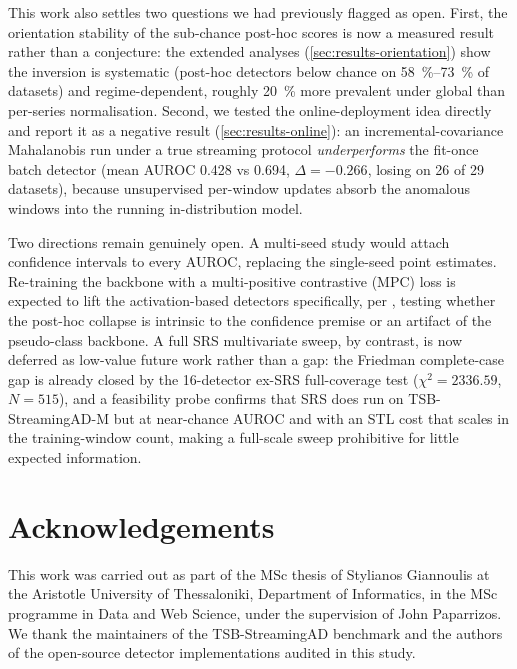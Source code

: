 \documentclass[11pt]{article}
\begin{document}
This work also settles two questions we had previously flagged as open. First, the
orientation stability of the sub-chance post-hoc scores is now a measured result
rather than a conjecture: the extended analyses (\cref{sec:results-orientation})
show the inversion is systematic (post-hoc detectors below chance on
\SIrange{58}{73}{\percent} of datasets) and regime-dependent, roughly
\SI{20}{\percent} more prevalent under global than per-series normalisation. Second,
we tested the online-deployment idea directly and report it as a negative result
(\cref{sec:results-online}): an incremental-covariance Mahalanobis run under a true
streaming protocol \emph{underperforms} the fit-once batch detector (mean AUROC
\num{0.428} vs \num{0.694}, $\Delta = \num{-0.266}$, losing on \num{26} of \num{29}
datasets), because unsupervised per-window updates absorb the anomalous windows into
the running in-distribution model.

Two directions remain genuinely open. A multi-seed study would attach confidence
intervals to every AUROC, replacing the single-seed point estimates. Re-training the
backbone with a multi-positive contrastive (MPC) loss is expected to lift the
activation-based detectors specifically, per \citet{Gungor2025}, testing whether the
post-hoc collapse is intrinsic to the confidence premise or an artifact of the
pseudo-class backbone. A full SRS multivariate sweep, by contrast, is now deferred as
low-value future work rather than a gap: the Friedman complete-case gap is already
closed by the \num{16}-detector ex-SRS full-coverage test ($\chi^2 = \num{2336.59}$,
$N = \num{515}$), and a feasibility probe confirms that SRS does run on
TSB-StreamingAD-M but at near-chance AUROC and with an STL cost that scales in the
training-window count, making a full-scale sweep prohibitive for little expected
information.

\section*{Acknowledgements}
This work was carried out as part of the MSc thesis of Stylianos Giannoulis at the
Aristotle University of Thessaloniki, Department of Informatics, in the MSc programme
in Data and Web Science, under the supervision of John Paparrizos. We thank the
maintainers of the TSB-StreamingAD benchmark and the authors of the open-source
detector implementations audited in this study.




\appendix

\end{document}

